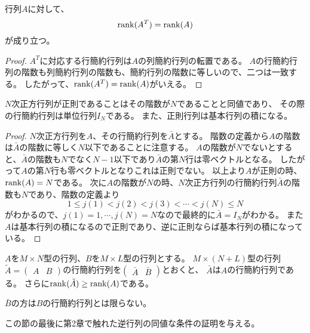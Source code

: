 \begin{proposition}[転置の階数]
行列$A$に対して、
$$
\rank(A^T) = \rank(A)
$$
が成り立つ。
\end{proposition}

\begin{proof}
$A^T$に対応する行簡約行列は$A$の列簡約行列の転置である。
$A$の行簡約行列の階数も列簡約行列の階数も、簡約行列の階数に等しいので、二つは一致する。
したがって、$\rank(A^T) = \rank(A)$がいえる。
\end{proof}

\begin{proposition}[正則行列の階数]
$N$次正方行列が正則であることはその階数が$N$であることと同値であり、
その際の行簡約行列は単位行列$I_N$である。
また、正則行列は基本行列の積になる。
\end{proposition}

\begin{proof}
$N$次正方行列を$A$、その行簡約行列を$\bar{A}$とする。
階数の定義から$A$の階数は$\bar{A}$の階数に等しく$N$以下であることに注意する。
$A$の階数が$N$でないとすると、$\bar{A}$の階数も$N$でなく$N-1$以下であり$\bar{A}$の第$N$行は零ベクトルとなる。
したがって$A$の第$N$行も零ベクトルとなりこれは正則でない。
以上より$A$が正則の時、$\rank(A) = N$である。
次に$A$の階数が$N$の時、$N$次正方行列の行簡約行列$\bar{A}$の階数も$N$であり、階数の定義より
$$
1 \le j(1) < j(2) < j(3) < \cdots < j(N) \le N
$$
がわかるので、$j(1) = 1, \cdots, j(N) = N$なので最終的に$\bar{A} = I_N$がわかる。
また$A$は基本行列の積になるので正則であり、逆に正則ならば基本行列の積になっている。
\end{proof}

\begin{proposition}[区分けと行簡約行列]
$A$を$M\times N$型の行列、$B$を$M\times L$型の行列とする。
$M\times (N+L)$型の行列$\tilde{A} = \begin{pmatrix}A & B\end{pmatrix}$の行簡約行列を$\begin{pmatrix}\bar{A} & \bar{B}\end{pmatrix}$とおくと、
$\bar{A}$は$A$の行簡約行列である。
さらに$\rank(\tilde{A}) \ge \rank(A)$である。
\end{proposition}

\begin{remark}
$\bar{B}$の方は$B$の行簡約行列とは限らない。
\end{remark}

この節の最後に第2章で触れた逆行列の同値な条件の証明を与える。

